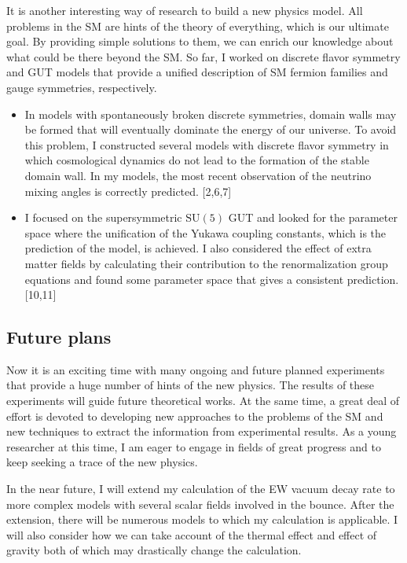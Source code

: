 \documentclass[12pt,notitlepage]{article}
\begin{document}
It is another interesting way of research to build a new physics model.
All problems in the SM are hints of the theory of everything, which is our ultimate goal.
By providing simple solutions to them, we can enrich our knowledge about what could be there beyond the SM.
So far, I worked on discrete flavor symmetry and GUT models that provide a unified description of SM fermion families and gauge symmetries, respectively.
\vspace{-1.3mm}
\begin{itemize}
  \setlength{\parskip}{0mm}
  \setlength{\itemsep}{1mm}
  \item
    In models with spontaneously broken discrete symmetries, domain walls may be formed that will eventually dominate the energy of our universe.
    To avoid this problem, I constructed several models with discrete flavor symmetry in which cosmological dynamics do not lead to the formation of the stable domain wall.
    In my models, the most recent observation of the neutrino mixing angles is correctly predicted. [2,6,7]
  \item
    I focused on the supersymmetric $\mathrm{SU}(5)$ GUT and looked for the parameter space where the unification of the Yukawa coupling constants, which is the prediction of the model, is achieved.
    I also considered the effect of extra matter fields by calculating their contribution to the renormalization group equations and found some parameter space that gives a consistent prediction. [10,11]
\end{itemize}

\vspace*{-2mm}
\subsection*{Future plans}

Now it is an exciting time with many ongoing and future planned experiments that provide a huge number of hints of the new physics.
The results of these experiments will guide future theoretical works.
At the same time, a great deal of effort is devoted to developing new approaches to the problems of the SM and new techniques to extract the information from experimental results.
As a young researcher at this time, I am eager to engage in fields of great progress and to keep seeking a trace of the new physics.

In the near future, I will extend my calculation of the EW vacuum decay rate to more complex models with several scalar fields involved in the bounce.
After the extension, there will be numerous models to which my calculation is applicable.
I will also consider how we can take account of the thermal effect and effect of gravity both of which may drastically change the calculation.
\end{document}
